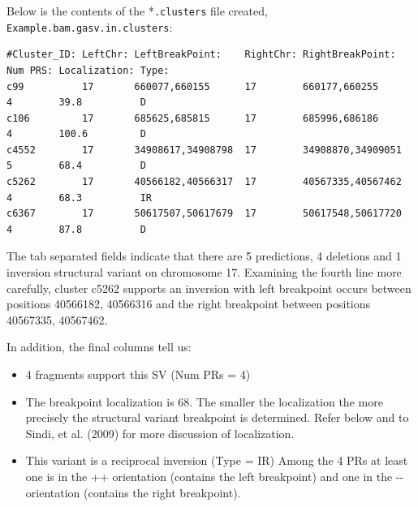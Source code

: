 \documentclass[11pt]{article}
\begin{document}
Below is the contents of the *\verb+.clusters+ file created, \verb+Example.bam.gasv.in.clusters+:

\begin{framed}
{ \scriptsize
\begin{Verbatim}
#Cluster_ID: LeftChr: LeftBreakPoint:    RightChr: RightBreakPoint:   Num PRS: Localization: Type:
c99          17       660077,660155      17        660177,660255      4        39.8          D
c106         17       685625,685815      17        685996,686186      4        100.6         D
c4552        17       34908617,34908798  17        34908870,34909051  5        68.4          D
c5262        17       40566182,40566317  17        40567335,40567462  4        68.3          IR
c6367        17       50617507,50617679  17        50617548,50617720  4        87.8          D
\end{Verbatim}
}
\end{framed}
The tab separated fields indicate that there are 5 predictions, 4 deletions and 1 
inversion structural variant on chromosome 17. Examining the fourth line more carefully, cluster c5262 supports an inversion with left breakpoint occurs between positions 40566182, 40566316 and the 
right breakpoint between positions 40567335, 40567462.

In addition, the final columns tell us:
\begin{itemize}
\item 4 fragments support this SV (Num PRs = 4)
\item The breakpoint localization is 68. 
		The smaller the localization the more precisely the
		structural variant breakpoint is determined. Refer below and to Sindi, et al. (2009)  for more discussion 
		of localization.
\item This variant is a reciprocal inversion (Type = IR)
		Among the 4 PRs at least one is in the ++ orientation 
		(contains the left breakpoint) and one in the 
		-{}- orientation (contains the right breakpoint). 
\end{itemize}
\end{document}
